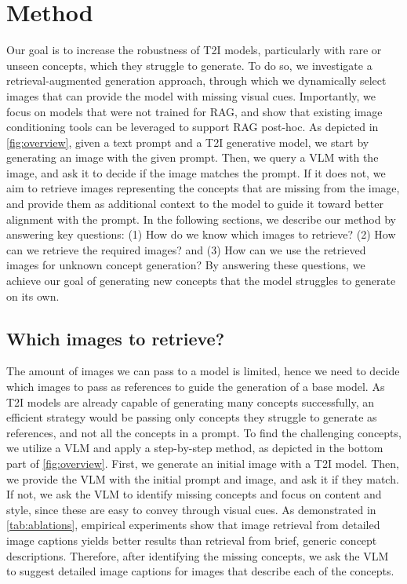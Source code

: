 \vspace{-5pt}
\section{Method}
\label{sec:method}


Our goal is to increase the robustness of T2I models, particularly with rare or unseen concepts, which they struggle to generate. To do so, we investigate a retrieval-augmented generation approach, through which we dynamically select images that can provide the model with missing visual cues. Importantly, we focus on models that were not trained for RAG, and show that existing image conditioning tools can be leveraged to support RAG post-hoc.
As depicted in \cref{fig:overview}, given a text prompt and a T2I generative model, we start by generating an image with the given prompt. Then, we query a VLM with the image, and ask it to decide if the image matches the prompt. If it does not, we aim to retrieve images representing the concepts that are missing from the image, and provide them as additional context to the model to guide it toward better alignment with the prompt.
In the following sections, we describe our method by answering key questions:
(1) How do we know which images to retrieve? 
(2) How can we retrieve the required images? 
and (3) How can we use the retrieved images for unknown concept generation?
By answering these questions, we achieve our goal of generating new concepts that the model struggles to generate on its own.

\vspace{-3pt}
\subsection{Which images to retrieve?}
The amount of images we can pass to a model is limited, hence we need to decide which images to pass as references to guide the generation of a base model. As T2I models are already capable of generating many concepts successfully, an efficient strategy would be passing only concepts they struggle to generate as references, and not all the concepts in a prompt.
To find the challenging concepts,
we utilize a VLM and apply a step-by-step method, as depicted in the bottom part of \cref{fig:overview}. First, we generate an initial image with a T2I model. Then, we provide the VLM with the initial prompt and image, and ask it if they match. If not, we ask the VLM to identify missing concepts and
focus on content and style, since these are easy to convey through visual cues.
As demonstrated in \cref{tab:ablations}, empirical experiments show that image retrieval from detailed image captions yields better results than retrieval from brief, generic concept descriptions.
Therefore, after identifying the missing concepts, we ask the VLM to suggest detailed image captions for images that describe each of the concepts. 

